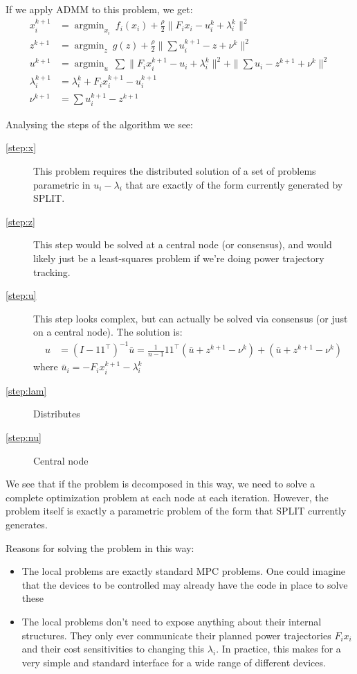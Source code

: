 \documentclass[11pt,a4paper]{article}
\newcommand{\tp}{\top}
\newcommand{\argmin}{\operatorname{argmin}}
\begin{document}
If we apply ADMM to this problem, we get:
\begin{subequations}
\begin{align}
\label{step:x}x_i^{k+1} &= \argmin_{x_i}\ f_i(x_i) + \frac{\rho}{2}\|F_ix_i - u_i^k + \lambda_i^k\|^2\\
\label{step:z}z^{k+1} &= \argmin_z\ g(z) + \frac{\rho}{2}\|\sum u_i^{k+1} - z + \nu^k\|^2\\
\label{step:u}u^{k+1} &= \argmin_{u}\ \sum \|F_ix_i^{k+1} - u_i + \lambda_i^k\|^2 + \|\sum u_i - z^{k+1} + \nu^k\|^2\\
\label{step:lam}\lambda_i^{k+1} &= \lambda_i^k + F_ix_i^{k+1} - u_i^{k+1}\\
\label{step:nu}\nu^{k+1} &= \sum u_i^{k+1} - z^{k+1}
\end{align}
\end{subequations}

Analysing the steps of the algorithm we see:
\begin{description}
  \item[\ref{step:x}] This problem requires the distributed solution of a set of problems parametric in $u_i - \lambda_i$ that are exactly of the form currently generated by SPLIT.
  \item[\ref{step:z}] This step would be solved at a central node (or consensus), and would likely just be a least-squares problem if we're doing power trajectory tracking.
  \item[\ref{step:u}] This step looks complex, but can actually be solved via consensus (or just on a central node). The solution is:
  \begin{align*}
  u &= (I-11^\tp)^{-1}\bar u = \frac{1}{n-1}11^\tp (\bar u + z^{k+1} - \nu^k) + (\bar u + z^{k+1} - \nu^k)
  \end{align*}
  where $\bar u_i = -F_ix_i^{k+1} - \lambda_i^k$
  \item[\ref{step:lam}] Distributes
  \item[\ref{step:nu}] Central node
\end{description}

We see that if the problem is decomposed in this way, we need to solve a complete optimization problem at each node at each iteration. However, the problem itself is exactly a parametric problem of the form that SPLIT currently generates.

Reasons for solving the problem in this way:
\begin{itemize}
  \item The local problems are exactly standard MPC problems. One could imagine that the devices to be controlled may already have the code in place to solve these
  \item The local problems don't need to expose anything about their internal structures. They only ever communicate their planned power trajectories $F_ix_i$ and their cost sensitivities to changing this $\lambda_i$. In practice, this makes for a very simple and standard interface for a wide range of different devices.
\end{itemize}
\end{document}
